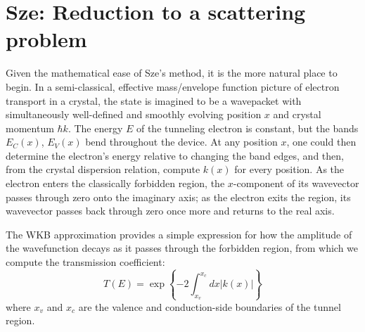 \section{Sze: Reduction to a scattering problem}
Given the mathematical ease of Sze's method, it is the more natural place to begin.  In a semi-classical, effective mass/envelope function picture of electron transport in a crystal, the state is imagined to be a wavepacket with simultaneously well-defined and smoothly evolving position $x$ and crystal momentum $\hbar k$.  The energy $E$ of the tunneling electron is constant, but the bands $E_C(x)$, $E_V(x)$ bend throughout the device.  At any position $x$, one could then determine the electron's energy relative to changing the band edges, and then, from the crystal dispersion relation, compute $k(x)$ for every position.  As the electron enters the classically forbidden region, the $x$-component of its wavevector passes through zero onto the imaginary axis; as the electron exits the region, its wavevector passes back through zero once more and returns to the real axis.  

The WKB approximation provides a simple expression for how the amplitude of the wavefunction decays as it passes through the forbidden region, from which we compute the transmission coefficient:
$$T(E)=\exp\left\{-2\int_{x_v}^{x_c}dx|k(x)|\right\}$$
where $x_v$ and $x_c$ are the valence and conduction-side boundaries of the tunnel region.